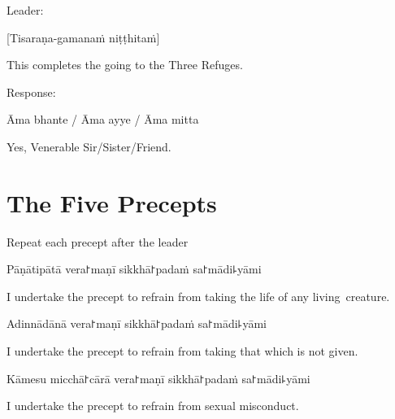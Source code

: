 \begin{instruction}
  Leader:
\end{instruction}

[Tisaraṇa-gamanaṁ niṭṭhitaṁ]

\begin{english}
  This completes the going to the Three Refuges.
\end{english}

\begin{instruction}
  Response:
\end{instruction}

Āma bhante / Āma ayye / Āma mitta

\begin{english}
  Yes, Venerable Sir/Sister/Friend.
\end{english}

\chapter{The Five Precepts}%

\begin{instruction}
  Repeat each precept after the leader
\end{instruction}

\begin{precept}
  \setcounter{enumi}{0}
  \item Pāṇātipātā vera꜓maṇī sikkhā꜓padaṁ sa꜓mādi꜕yāmi
\end{precept}

\begin{english}
  I undertake the precept to refrain from taking the life of any living~creature.
\end{english}

\begin{precept}
  \setcounter{enumi}{1}
  \item Adinnādānā vera꜓maṇī sikkhā꜓padaṁ sa꜓mādi꜕yāmi
\end{precept}

\begin{english}
  I undertake the precept to refrain from taking that which is not given.
\end{english}

\begin{precept}
  \setcounter{enumi}{2}
  \item Kāmesu micchā꜓cārā vera꜓maṇī sikkhā꜓padaṁ sa꜓mādi꜕yāmi
\end{precept}

\begin{english}
  I undertake the precept to refrain from sexual misconduct.
\end{english}

